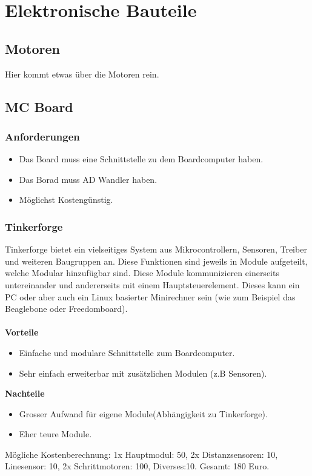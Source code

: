 \section{Elektronische Bauteile}
\subsection {Motoren}
Hier kommt etwas über die Motoren rein.

\subsection*{MC Board}
\subsubsection{Anforderungen}
\begin{itemize}
\item Das Board muss eine Schnittstelle zu dem Boardcomputer haben.
\item Das Borad muss AD Wandler haben.
\item Möglichst Kostengünstig.
\end{itemize}


\subsubsection{Tinkerforge}
Tinkerforge bietet ein vielseitiges System aus Mikrocontrollern, Sensoren, Treiber und weiteren Baugruppen an. Diese Funktionen sind jeweils in Module aufgeteilt, welche Modular hinzufügbar sind. Diese Module kommunizieren einerseits untereinander und andererseits mit einem Hauptsteuerelement. Dieses kann ein PC oder aber auch ein Linux basierter Minirechner sein (wie zum Beispiel das Beaglebone oder Freedomboard).\\\\
\textbf {Vorteile}
\begin{itemize}
\item Einfache und modulare Schnittstelle zum Boardcomputer.
\item Sehr einfach erweiterbar mit zusätzlichen Modulen (z.B Sensoren).\\
\end{itemize}
\textbf {Nachteile}
\begin{itemize}
\item Grosser Aufwand für eigene Module(Abhängigkeit zu Tinkerforge).
\item Eher teure Module.		
\end{itemize}
Mögliche Kostenberechnung: 1x Hauptmodul: 50, 2x Distanzsensoren: 10, Linesensor: 10, 2x Schrittmotoren: 100, Diverses:10. Gesamt: 180 Euro.

